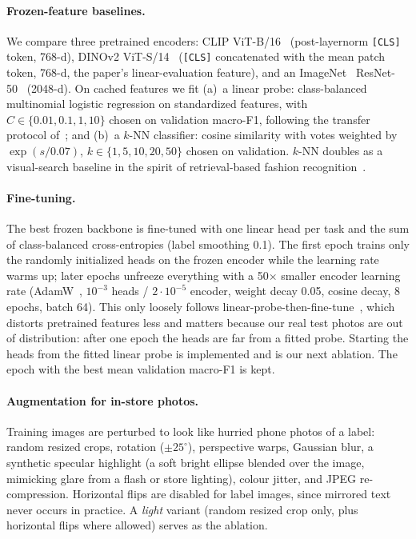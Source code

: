 \paragraph{Frozen-feature baselines.}
We compare three pretrained encoders: CLIP ViT-B/16~\cite{radford2021clip}
(post-layernorm \texttt{[CLS]} token, 768-d), DINOv2 ViT-S/14~\cite{oquab2024dinov2}
(\texttt{[CLS]} concatenated with the mean patch token, 768-d, the paper's linear-evaluation
feature), and an ImageNet~\cite{deng2009imagenet} ResNet-50~\cite{he2016resnet} (2048-d).
On cached features we fit (a)~a linear probe: class-balanced multinomial logistic regression on
standardized features, with $C\in\{0.01,0.1,1,10\}$ chosen on validation macro-F1, following
the transfer protocol of~\cite{kornblith2019transfer}; and (b)~a $k$-NN classifier: cosine
similarity with votes weighted by $\exp(s/0.07)$, $k\in\{1,5,10,20,50\}$ chosen on validation.
$k$-NN doubles as a visual-search baseline in the spirit of retrieval-based fashion
recognition~\cite{liu2016deepfashion,kiapour2015where}.

\paragraph{Fine-tuning.}
The best frozen backbone is fine-tuned with one linear head per task and the sum of
class-balanced cross-entropies (label smoothing 0.1). The first epoch trains only the randomly
initialized heads on the frozen encoder while the learning rate warms up; later epochs unfreeze
everything with a 50$\times$ smaller encoder learning rate (AdamW~\cite{loshchilov2019adamw},
$10^{-3}$ heads / $2\cdot10^{-5}$ encoder, weight decay 0.05, cosine decay, 8 epochs, batch 64).
This only loosely follows linear-probe-then-fine-tune~\cite{kumar2022finetuning}, which distorts
pretrained features less and matters because our real test photos are out of distribution: after
one epoch the heads are far from a fitted probe. Starting the heads from the fitted linear probe is
implemented and is our next ablation. The epoch with the best mean validation macro-F1 is kept.

\paragraph{Augmentation for in-store photos.}
Training images are perturbed to look like hurried phone photos of a label: random resized
crops, rotation ($\pm25^\circ$), perspective warps, Gaussian blur, a synthetic specular
highlight (a soft bright ellipse blended over the image, mimicking glare from a flash or store
lighting), colour jitter, and JPEG re-compression. Horizontal flips are disabled for label
images, since mirrored text never occurs in practice. A \emph{light} variant (random resized
crop only, plus horizontal flips where allowed) serves as the ablation.

